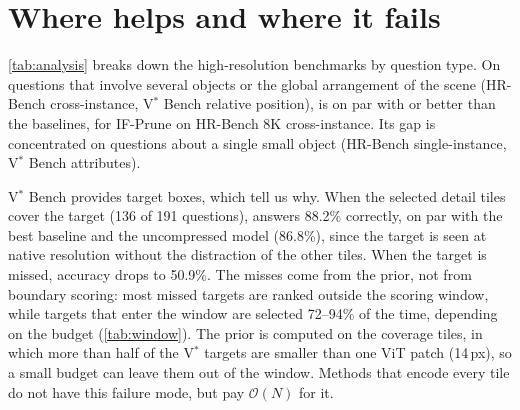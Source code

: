 \section{Where \method helps and where it fails}
\label{sec:analysis}



\cref{tab:analysis} breaks down the high-resolution benchmarks by question type. On questions that
involve several objects or the global arrangement of the scene (HR-Bench cross-instance, V$^*$ Bench
relative position), \method is on par with or better than the baselines,   for IF-Prune
on HR-Bench 8K cross-instance. Its gap is concentrated on questions about a single small object
(HR-Bench single-instance, V$^*$ Bench attributes).

V$^*$ Bench provides target boxes, which tell us why. When the selected detail tiles cover the target
(136 of 191 questions), \method answers 88.2\% correctly, on par with the best baseline and the
uncompressed model (86.8\%), since the target is seen at native resolution without the distraction of
the other tiles. When the target is missed, accuracy drops to 50.9\%. The misses come from the prior,
not from boundary scoring: most missed targets are ranked outside the scoring window, while targets
that enter the window are selected 72--94\% of the time, depending on the budget (\cref{tab:window}). The prior is computed
on the coverage tiles, in which more than half of the V$^*$ targets are smaller than one ViT patch
(14\,px), so a small budget can leave them out of the window. Methods
that encode every tile do not have this failure mode, but pay $\mathcal{O}(N)$ for it.

